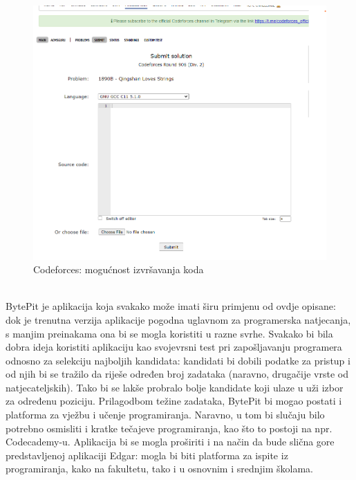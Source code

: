 		\begin{figure}[H]
			\includegraphics[scale=0.4]{slike/cf2}
			\centering
			\caption{Codeforces: mogućnost izvršavanja koda}
			\label{fig:run}
		\end{figure}
		
		\noindent\\
		BytePit je aplikacija koja svakako može imati širu primjenu od ovdje opisane: dok je trenutna verzija aplikacije pogodna uglavnom za programerska natjecanja, s manjim preinakama ona bi se mogla koristiti u razne svrhe. Svakako bi bila dobra ideja koristiti aplikaciju kao svojevrsni test pri zapošljavanju programera odnosno za selekciju najboljih kandidata: kandidati bi dobili podatke za pristup i od njih bi se tražilo da riješe određen broj zadataka (naravno, drugačije vrste od natjecateljskih). Tako bi se lakše probralo bolje kandidate koji ulaze u uži izbor za određenu poziciju. Prilagodbom težine zadataka, BytePit bi mogao postati i platforma za vježbu i učenje programiranja. Naravno, u tom bi slučaju bilo potrebno osmisliti i kratke tečajeve programiranja, kao što to postoji na npr. Codecademy-u.
		Aplikacija bi se mogla proširiti i na način da bude slična gore predstavljenoj aplikaciji Edgar: mogla bi biti platforma za ispite iz programiranja, kako na fakultetu, tako i u osnovnim i srednjim školama.\\
		
		\eject

		
		
	